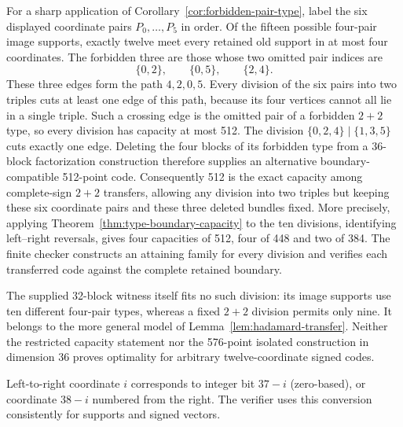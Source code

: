 For a sharp application of Corollary~\ref{cor:forbidden-pair-type},
label the six displayed coordinate pairs $P_0,\ldots,P_5$ in order.
Of the fifteen possible
four-pair image supports, exactly twelve meet every retained old
support in at most four coordinates. The forbidden three are those
whose two omitted pair indices are
\[
 \{0,2\},\qquad\{0,5\},\qquad\{2,4\}.
\]
These three edges form the path $4,2,0,5$. Every division of the six
pairs into two triples cuts at least one edge of this path, because
its four vertices cannot all lie in a single triple. Such a crossing
edge is the omitted pair of a forbidden $2+2$ type, so every division
has capacity at most 512. The division
$\{0,2,4\}\mid\{1,3,5\}$ cuts exactly one edge. Deleting the four
blocks of its forbidden type from a 36-block factorization construction
therefore supplies an alternative boundary-compatible 512-point code.
Consequently 512 is the exact capacity among complete-sign $2+2$
transfers, allowing any division into two triples but keeping these
six coordinate pairs and these three deleted bundles fixed.
More precisely, applying Theorem~\ref{thm:type-boundary-capacity}
to the ten divisions, identifying left--right reversals, gives four
capacities of 512, four of 448 and two of 384. The finite checker
constructs an attaining family for every division and verifies each
transferred code against the complete retained boundary.

The supplied 32-block witness itself fits no such division: its image
supports use ten different four-pair types, whereas a fixed $2+2$
division permits only nine. It belongs to the more general model of
Lemma~\ref{lem:hadamard-transfer}. Neither the restricted capacity
statement nor the 576-point isolated construction in dimension 36
proves optimality for arbitrary twelve-coordinate signed codes.

Left-to-right coordinate $i$ corresponds to integer bit $37-i$ (zero-based),
or coordinate $38-i$ numbered from the right. The verifier uses this
conversion consistently for supports and signed vectors.
